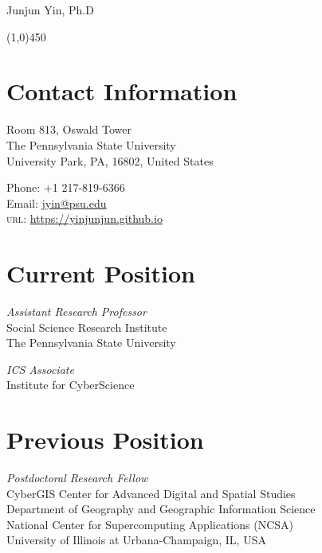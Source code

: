 \documentclass[11pt, a4paper]{article}
\begin{document}
{\LARGE Junjun Yin, Ph.D}
\begin{center}
\line(1,0){450}
\end{center}
\section*{Contact Information}

\begin{multicols}{2}
 \begin{flushleft}
Room 813, Oswald Tower\\
The Pennsylvania State University\\
University Park, PA, 16802, United States
\end{flushleft}
\columnbreak
\begin{flushright}
Phone: +1 217-819-6366\\[.1cm]
Email: \href{mailto:a.jyin@psu.edu}{jyin@psu.edu}\\[.1cm]
\textsc{url}: \href{https://yinjunjun.github.io}{https://yinjunjun.github.io}
\end{flushright}
\end{multicols}


\section*{Current Position}
\begin{multicols}{2}
 \begin{flushleft}
\emph{Assistant Research Professor}\\
Social Science Research Institute\\
The Pennsylvania State University\\
\end{flushleft}
\columnbreak
\begin{flushright}
\emph{ICS Associate}\\
Institute for CyberScience\\
\end{flushright}
\end{multicols}

\section*{Previous Position}
\emph{Postdoctoral Research Fellow}\\
CyberGIS Center for Advanced Digital and Spatial Studies\\
Department of Geography and Geographic Information Science\\
National Center for Supercomputing Applications (NCSA)\\
University of Illinois at Urbana-Champaign, IL, USA
\end{document}
